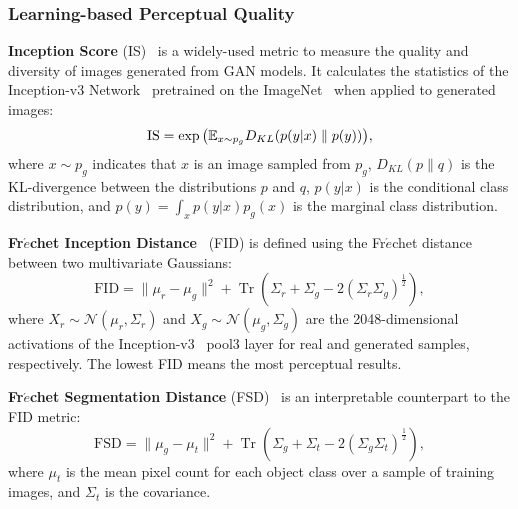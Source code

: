 \subsubsection{Learning-based Perceptual Quality}
\noindent\textbf{Inception Score} (IS)~\cite{salimans2016improved} is a widely-used metric to measure the quality and diversity of images generated from GAN models. It calculates the statistics of the Inception-v3 Network~\cite{szegedy2016rethinking} pretrained on the ImageNet~\cite{deng2009imagenet} when applied to generated images:
\begin{equation}
\mathrm{IS} = \exp{\big (\mathbb{E}_{x \sim p_g} D_{KL} (p(y|x) \;\|\; p(y))\big)},
\end{equation}
where $x \sim p_g$ indicates that $x$ is an image sampled from $p_g$, $D_{KL}(p\|q)$ is the KL-divergence between the distributions $p$ and $q$, $p(y|x)$ is the conditional class distribution, and $p(y) = \int_x p(y|x)p_g(x)$ is the marginal class distribution.\par

\vspace{1mm}
\noindent\textbf{Fr$\acute{e}$chet Inception Distance}~\cite{heusel2017gans} (FID) is defined using the Fr$\acute{e}$chet distance between two multivariate Gaussians:
\begin{equation}
\mathrm{FID}=\|\mu_{r}-\mu_{g}\|^{2}+\operatorname{Tr}(\Sigma_{r}+\Sigma_{g}-2(\Sigma_{r} \Sigma_{g})^{\frac{1}{2}}),
\end{equation}
where $X_{r} \sim \mathcal{N}(\mu_{r}, \Sigma_{r})$ and $X_{g} \sim \mathcal{N}(\mu_{g}, \Sigma_{g})$ are the 2048-dimensional activations of the Inception-v3~\cite{szegedy2016rethinking} pool3 layer for real and generated samples, respectively.
The lowest FID means the most perceptual results.\par

\vspace{1mm}
\noindent\textbf{Fr$\acute{e}$chet Segmentation Distance} (FSD)~\cite{bau2019seeing} is an interpretable counterpart to the FID metric:
\begin{equation}
\mathrm{FSD} = \|\mu_{g}-\mu_{t}\|^{2}+\operatorname{Tr}(\Sigma_{g}+\Sigma_{t}-2(\Sigma_{g} \Sigma_{t})^{\frac{1}{2}}),
\end{equation}
where $\mu_{t}$ is the mean pixel count for each object class over a sample of training images, and $\Sigma_{t}$ is the covariance.\par

